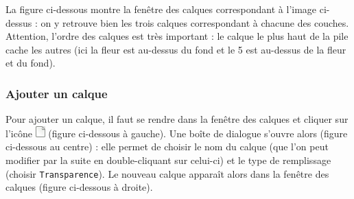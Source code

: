\begin{minipage}[c]{.22\textwidth}
\end{minipage}\hfill%
\begin{minipage}[c]{.22\textwidth}
\end{minipage}\hfill%
\begin{minipage}[c]{.22\textwidth}
\end{minipage}\hfill%
\begin{minipage}[c]{.22\textwidth}
\end{minipage}


\vspace{12pt}

La figure ci-dessous montre la fenêtre des calques correspondant à l'image ci-dessus : on y retrouve bien les trois calques correspondant à chacune des couches. Attention, l'ordre des calques est très important : le calque le plus haut de la pile cache les autres (ici la fleur est au-dessus du fond et le 5 est au-dessus de la fleur et du fond).






\subsubsection{Ajouter un calque}\label{Gimp2CalquesAjouter}

Pour ajouter un calque, il faut se rendre dans la fenêtre des calques et cliquer sur l'icône \includegraphics[width=.4cm]{./images/image02/CalqueAjouter} (figure ci-dessous à gauche). Une boîte de dialogue s'ouvre alors (figure ci-dessous au centre) : elle permet de choisir le nom du calque (que l'on peut modifier par la suite en double-cliquant sur celui-ci) et le type de remplissage (choisir \texttt{Transparence}). Le nouveau calque apparaît alors dans la fenêtre des calques (figure ci-dessous à droite).

\vspace{12pt}

